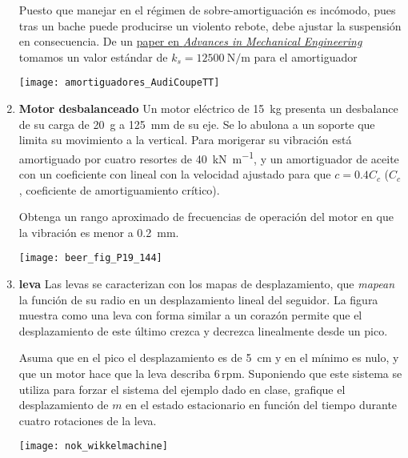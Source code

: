\documentclass[11pt, spanish, a4paper, twopage]{article}
\begin{document}
\begin{enumerate}
\begin{minipage}[t][6cm]{0.65\textwidth}
	Puesto que manejar en el régimen de sobre-amortiguación es incómodo, pues tras un bache puede producirse un violento rebote, debe ajustar la suspensión en consecuencia.
	De un \href{https://journals.sagepub.com/doi/pdf/10.1177/1687814016648638}{paper en \emph{Advances in Mechanical Engineering}} tomamos un valor estándar de $k_s = \SI{12500}{\newton\per\metre}$ para el amortiguador
\end{minipage}
\begin{minipage}[c][0cm][t]{0.3\textwidth}
	\texttt{[image: amortiguadores\_AudiCoupeTT]}
\end{minipage}



\item 
	\begin{minipage}[t][3.5cm]{0.75\textwidth}
	\textbf{Motor desbalanceado}
	Un motor eléctrico de \SI{15}{\kilo\gram} presenta un desbalance de su carga de \SI{20}{\gram} a \SI{125}{\milli\metre} de su eje.
	Se lo abulona a un soporte que limita su movimiento a la vertical.
	Para morigerar su vibración está amortiguado por cuatro resortes de \SI{40}{\kilo\newton\per\metre}, y un amortiguador de aceite con un coeficiente con lineal con la velocidad ajustado para que $c = 0.4 C_c$ ($C_c$, coeficiente de amortiguamiento crítico).

	Obtenga un rango aproximado de frecuencias de operación del motor en que la vibración es menor a \SI{0.2}{\milli\metre}.
\end{minipage}
\begin{minipage}[c][2cm][t]{0.2\textwidth}
	\texttt{[image: beer\_fig\_P19\_144]}
\end{minipage}



\item
	\begin{minipage}[t][3.5cm]{0.75\textwidth}
	\textbf{leva}
	Las levas se caracterizan con los mapas de desplazamiento, que \emph{mapean} la función de su radio en un desplazamiento lineal del seguidor.
	La figura muestra como una leva con forma similar a un corazón permite que el desplazamiento de este último crezca y decrezca linealmente desde un pico.
				
	Asuma que en el pico el desplazamiento es de \SI{5}{\centi\metre} y en el mínimo es nulo, y que un motor hace que la leva describa $6\,\mathrm{rpm}$.  
	Suponiendo que este sistema se utiliza para forzar el sistema del ejemplo dado en clase, grafique el desplazamiento de $m$ en el estado estacionario en función del tiempo durante cuatro rotaciones de la leva.
\end{minipage}
\begin{minipage}[c][2cm][t]{0.2\textwidth}
	\texttt{[image: nok\_wikkelmachine]}
\end{minipage}




\end{enumerate}
\end{document}
